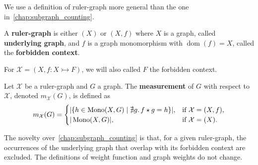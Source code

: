 
We use a definition of ruler-graph more general than the one in~\autoref{chap:subgraph_counting}.

\begin{definition}
    A \textbf{ruler-graph} is either $(X)$ or \( (X, f) \) where $X$ is a graph, called \textbf{underlying graph}, and $f$ is a graph monomorphism with $\operatorname{dom}(f) = X$, called the \textbf{forbidden context}.
\end{definition}
For $\mathcal{X} = (X, f:X \rightarrowtail F)$, we will also called $F$ the forbidden context.

\begin{definition}[Measurement]
    Let \( \mathcal{X}\) be a ruler-graph and \( G \) a graph. The \textbf{measurement} of \( G \) with respect to \( \mathcal{X}\), denoted \( m_\mathcal{X}(G) \), is defined as 
    \[
        m_\mathcal{X}(G) =
        \begin{cases}
            |\{h \in \operatorname{Mono}(X,G) \mid \nexists g.\,f \star g = h \}|, & \text{if } \mathcal{X} = (X, f), \\
            |\operatorname{Mono}(X,G)|, & \text{if } \mathcal{X} = (X).
        \end{cases}
    \]
\end{definition}
The novelty over~\autoref{chap:subgraph_counting} is that, for a given ruler-graph, the occurrences of the underlying graph that overlap with its forbidden context are excluded. The definitions of weight function and graph weights do not change.
